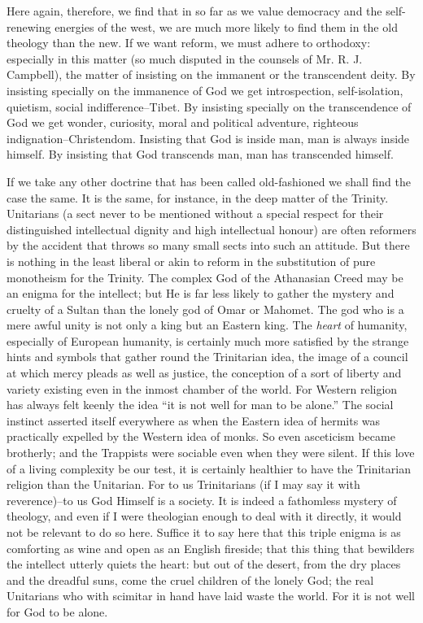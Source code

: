 \documentclass{book}
\begin{document}
Here again, therefore, we find that in so far as we value democracy and the self-renewing energies of the west, we are much more likely to find them in the old theology than the new. If we want reform, we must adhere to orthodoxy: especially in this matter (so much disputed in the counsels of Mr. R. J. Campbell), the matter of insisting on the immanent or the transcendent deity. By insisting specially on the immanence of God we get introspection, self-isolation, quietism, social indifference–Tibet. By insisting specially on the transcendence of God we get wonder, curiosity, moral and political adventure, righteous indignation–Christendom. Insisting that God is inside man, man is always inside himself. By insisting that God transcends man, man has transcended himself.

If we take any other doctrine that has been called old-fashioned we shall find the case the same. It is the same, for instance, in the deep matter of the Trinity. Unitarians (a sect never to be mentioned without a special respect for their distinguished intellectual dignity and high intellectual honour) are often reformers by the accident that throws so many small sects into such an attitude. But there is nothing in the least liberal or akin to reform in the substitution of pure monotheism for the Trinity. The complex God of the Athanasian Creed may be an enigma for the intellect; but He is far less likely to gather the mystery and cruelty of a Sultan than the lonely god of Omar or Mahomet. The god who is a mere awful unity is not only a king but an Eastern king. The \emph{heart} of humanity, especially of European humanity, is certainly much more satisfied by the strange hints and symbols that gather round the Trinitarian idea, the image of a council at which mercy pleads as well as justice, the conception of a sort of liberty and variety existing even in the inmost chamber of the world. For Western religion has always felt keenly the idea “it is not well for man to be alone.” The social instinct asserted itself everywhere as when the Eastern idea of hermits was practically expelled by the Western idea of monks. So even asceticism became brotherly; and the Trappists were sociable even when they were silent. If this love of a living complexity be our test, it is certainly healthier to have the Trinitarian religion than the Unitarian. For to us Trinitarians (if I may say it with reverence)–to us God Himself is a society. It is indeed a fathomless mystery of theology, and even if I were theologian enough to deal with it directly, it would not be relevant to do so here. Suffice it to say here that this triple enigma is as comforting as wine and open as an English fireside; that this thing that bewilders the intellect utterly quiets the heart: but out of the desert, from the dry places and the dreadful suns, come the cruel children of the lonely God; the real Unitarians who with scimitar in hand have laid waste the world. For it is not well for God to be alone.
\end{document}
